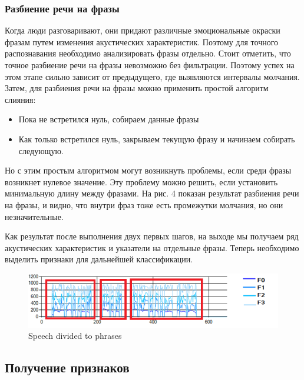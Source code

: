\documentclass[14pt]{extarticle}
\begin{document}
\subsubsection{Разбиение речи на фразы}

Когда люди разговаривают, они придают различные эмоциональные окраски фразам путем изменения акустических характеристик. Поэтому для точного распознавания необходимо анализировать фразы отдельно.
Стоит отметить, что точное разбиение речи на фразы невозможно без фильтрации. Поэтому успех на этом этапе сильно зависит от предыдущего, где выявляются интервалы молчания. Затем, для разбиения речи на фразы можно применить простой алгоритм слияния:
 \begin{itemize}
	 \item Пока не встретился нуль, собираем данные фразы
		\item Как только встретился нуль, закрываем текущую фразу и начинаем собирать следующую.
 \end{itemize}

Но с этим простым алгоритмом могут возникнуть проблемы, если среди фразы возникнет нулевое значение. Эту проблему можно решить, если установить минимальную длину между фразами.
На рис. 4 показан результат разбиения речи на фразы, и видно, что внутри фраз тоже есть промежутки молчания, но они незначительные. 

Как результат после выполнения двух первых шагов, на выходе мы получаем ряд акустических характеристик и указатели на отдельные фразы. Теперь необходимо выделить признаки для дальнейшей классификации.
\begin{figure}
	\centering
		\includegraphics[scale=1]{images/phrases.png}
	\caption{Speech divided to phrases}
	\label{fig:phrases}
\end{figure}


\subsection{Получение признаков}
\end{document}
